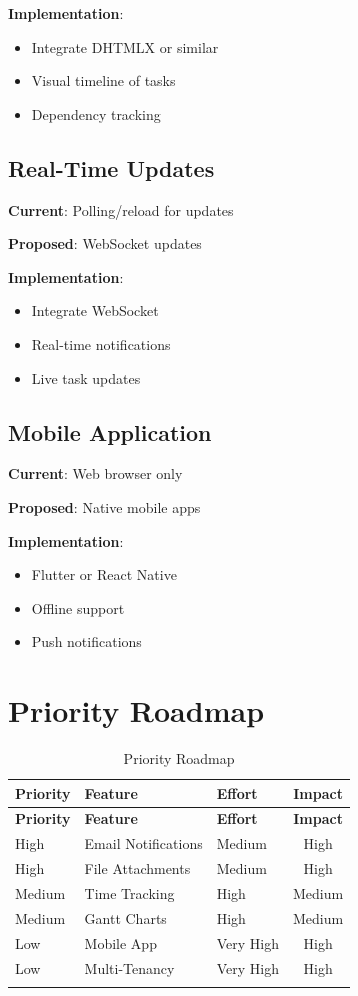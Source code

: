 \documentclass[12pt,a4paper,twoside]{book}
\begin{document}
\textbf{Implementation}:
\begin{itemize}
    \item Integrate DHTMLX or similar
    \item Visual timeline of tasks
    \item Dependency tracking
\end{itemize}

\subsection{Real-Time Updates}
\textbf{Current}: Polling/reload for updates

\textbf{Proposed}: WebSocket updates

\textbf{Implementation}:
\begin{itemize}
    \item Integrate WebSocket
    \item Real-time notifications
    \item Live task updates
\end{itemize}

\subsection{Mobile Application}
\textbf{Current}: Web browser only

\textbf{Proposed}: Native mobile apps

\textbf{Implementation}:
\begin{itemize}
    \item Flutter or React Native
    \item Offline support
    \item Push notifications
\end{itemize}

\section{Priority Roadmap}

\begin{longtable}{|l|l|l|c|}
\hline
\textbf{Priority} & \textbf{Feature} & \textbf{Effort} & \textbf{Impact} \\ \hline
\endfirsthead
\hline
\textbf{Priority} & \textbf{Feature} & \textbf{Effort} & \textbf{Impact} \\ \hline
\endhead
High & Email Notifications & Medium & High \\ \hline
High & File Attachments & Medium & High \\ \hline
Medium & Time Tracking & High & Medium \\ \hline
Medium & Gantt Charts & High & Medium \\ \hline
Low & Mobile App & Very High & High \\ \hline
Low & Multi-Tenancy & Very High & High \\ \hline
\caption{Priority Roadmap}
\end{longtable}
\end{document}
